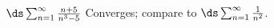 {$\ds \sum_{n=1}^\infty \frac{n+5}{n^3-5}$
}
{Converges; compare to $\ds \sum_{n=1}^\infty \frac {1}{n^2}$. 
}
